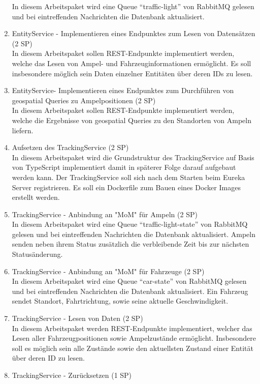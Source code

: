 \begin{enumerate}
  		In diesem Arbeitspaket wird eine Queue \enquote{traffic-light} von RabbitMQ gelesen und bei eintreffenden Nachrichten die Datenbank aktualisiert.
  \item EntityService - Implementieren eines Endpunktes zum Lesen von Datensätzen (2 SP)\\
  		In diesem Arbeitspaket sollen REST-Endpunkte implementiert werden, welche das Lesen von Ampel- und Fahrzeuginformationen ermöglicht.
  		Es soll insbesondere möglich sein Daten einzelner Entitäten über deren IDs zu lesen.
  \item EntityService- Implementieren eines Endpunktes zum Durchführen von geospatial Queries zu Ampelpositionen (2 SP)\\
  		In diesem Arbeitspaket sollen REST-Endpunkte implementiert werden, welche die Ergebnisse von geospatial Queries zu den Standorten von Ampeln liefern.
  \item Aufsetzen des TrackingService (2 SP)\\
  		In diesem Arbeitspaket wird die Grundstruktur des TrackingService auf Basis von TypeScript implementiert damit in späterer Folge darauf aufgebaut werden kann.
  		Der TrackingService soll sich nach dem Starten beim Eureka Server registrieren.
  		Es soll ein Dockerfile zum Bauen eines Docker Images erstellt werden.
  \item TrackingService - Anbindung an "MoM" für Ampeln (2 SP)\\
  		In diesem Arbeitspaket wird eine Queue \enquote{traffic-light-state} von RabbitMQ gelesen und bei eintreffenden Nachrichten die Datenbank aktualisiert.
  		Ampeln senden neben ihrem Status zusätzlich die verbleibende Zeit bis zur nächsten Statusänderung.
  \item TrackingService - Anbindung an "MoM" für Fahrzeuge (2 SP)\\
  		In diesem Arbeitspaket wird eine Queue \enquote{car-state} von RabbitMQ gelesen und bei eintreffenden Nachrichten die Datenbank aktualisiert.
  		Ein Fahrzeug sendet Standort, Fahrtrichtung, sowie seine aktuelle Geschwindigkeit.
  \item TrackingService - Lesen von Daten (2 SP)\\
  		In diesem Arbeitspaket werden REST-Endpunkte implementiert, welcher das Lesen aller Fahrzeugpositionen sowie Ampelzustände ermöglicht.
  		Insbesondere soll es möglich sein alle Zustände sowie den aktuellsten Zustand einer Entität über deren ID zu lesen.
  \item TrackingService - Zurücksetzen (1 SP)\\

\end{enumerate}
